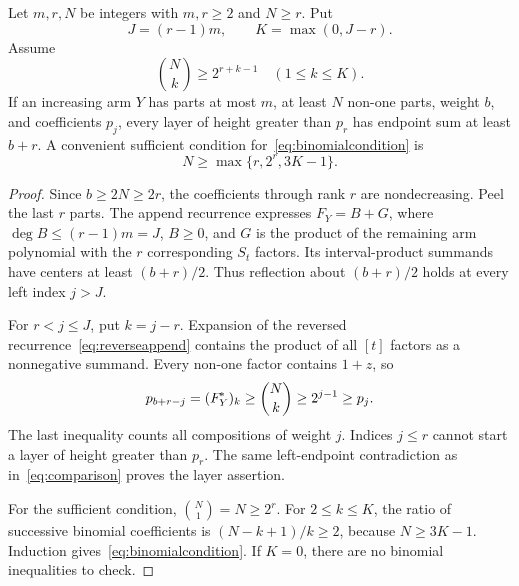 \begin{theorem}\label{thm:generalhigh}
Let $m,r,N$ be integers with $m,r\ge2$ and $N\ge r$. Put
\[
 J=(r-1)m,\qquad K=\max(0,J-r).
\]
Assume
\begin{equation}\label{eq:binomialcondition}
 \binom Nk\ge2^{r+k-1}\quad(1\le k\le K).
\end{equation}
If an increasing arm $Y$ has parts at most $m$, at least $N$ non-one parts, weight $b$, and coefficients $p_j$, every layer of height greater than $p_r$ has endpoint sum at least $b+r$. A convenient sufficient condition for~\eqref{eq:binomialcondition} is
\begin{equation}\label{eq:generalcutoff}
 N\ge\max\{r,2^r,3K-1\}.
\end{equation}
\end{theorem}
\begin{proof}
Since $b\ge2N\ge2r$, the coefficients through rank $r$ are nondecreasing. Peel the last $r$ parts. The append recurrence expresses $F_Y=B+G$, where $\deg B\le(r-1)m=J$, $B\ge0$, and $G$ is the product of the remaining arm polynomial with the $r$ corresponding $S_t$ factors. Its interval-product summands have centers at least $(b+r)/2$. Thus reflection about $(b+r)/2$ holds at every left index $j>J$.

For $r<j\le J$, put $k=j-r$. Expansion of the reversed recurrence~\eqref{eq:reverseappend} contains the product of all $[t]$ factors as a nonnegative summand. Every non-one factor contains $1+z$, so
\[
 p_{b+r-j}=(F_Y^{\!*})_k\ge\binom Nk\ge2^{j-1}\ge p_j.
\]
The last inequality counts all compositions of weight $j$. Indices $j\le r$ cannot start a layer of height greater than $p_r$. The same left-endpoint contradiction as in~\eqref{eq:comparison} proves the layer assertion.

For the sufficient condition, $\binom N1=N\ge2^r$. For $2\le k\le K$, the ratio of successive binomial coefficients is $(N-k+1)/k\ge2$, because $N\ge3K-1$. Induction gives~\eqref{eq:binomialcondition}. If $K=0$, there are no binomial inequalities to check.
\end{proof}



